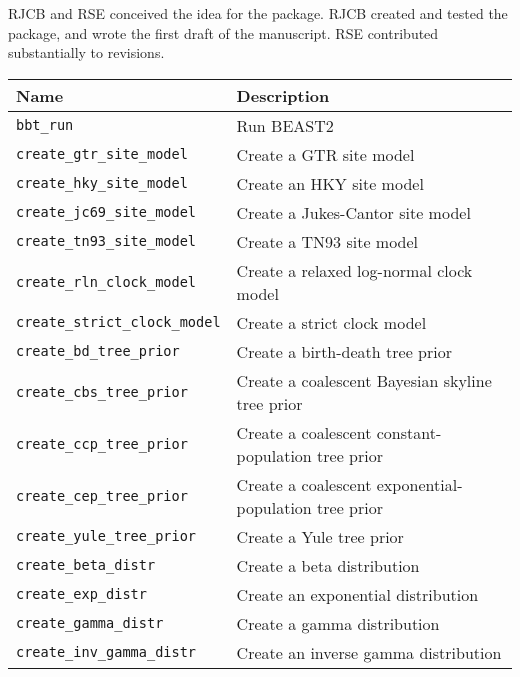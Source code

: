 RJCB and RSE conceived the idea for the package. 
RJCB created and tested the package, and wrote the first draft of the manuscript. 
RSE contributed substantially to revisions.




\begin{table}[h]
\centering
\begin{tabular}{ | l | l | }
\hline
\textbf{Name} & \textbf{Description} \\
\hline
\verb;bbt_run; & Run BEAST2 \\
\hline
\verb;create_gtr_site_model; & Create a GTR site model \\
\verb;create_hky_site_model; & Create an HKY site model \\
\verb;create_jc69_site_model; & Create a Jukes-Cantor site model \\
\verb;create_tn93_site_model; & Create a TN93 site model \\
\hline
\verb;create_rln_clock_model; & Create a relaxed log-normal clock model \\
\verb;create_strict_clock_model; & Create a strict clock model \\
\hline
\verb;create_bd_tree_prior; & Create a birth-death tree prior \\
\verb;create_cbs_tree_prior; & Create a coalescent Bayesian skyline tree prior \\
\verb;create_ccp_tree_prior; & Create a coalescent constant-population tree prior \\
\verb;create_cep_tree_prior; & Create a coalescent exponential-population tree prior \\
\verb;create_yule_tree_prior; & Create a Yule tree prior \\
\hline
\verb;create_beta_distr; & Create a beta distribution \\
\verb;create_exp_distr; & Create an exponential distribution \\
\verb;create_gamma_distr; & Create a gamma distribution \\
\verb;create_inv_gamma_distr; & Create an inverse gamma distribution \\

\end{tabular}
\end{table}
